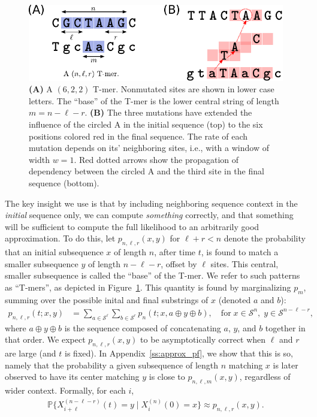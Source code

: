 \documentclass{article}
\renewcommand{\P}{\mathbb{P}}
\newcommand{\calS}{\mathcal{S}}  %
\newcommand{\nA}{\mbox{A}}  %
\newcommand{\join}{\oplus}  %
\theoremstyle{plain}
\theoremstyle{definition}
\begin{document}
\begin{figure}
    \begin{center}
        \includegraphics{Tmer-dependency}
    \end{center}
    \caption{
        \textbf{(A)} A $(6,2,2)$ T-mer.
        Nonmutated sites are shown in lower case letters.
        The ``base'' of the T-mer is the lower central
        string of length $m = n - \ell - r$.
        \textbf{(B)}
        The three mutations have extended the influence of the circled \nA{}
        in the initial sequence (top)
        to the six positions colored red in the final sequence.
        The rate of each mutation depends on its' neighboring sites,
        i.e., with a window of width $w=1$.
        Red dotted arrows show the propagation of dependency
        between the circled \nA{}
        and the third site in the final sequence (bottom).
        \label{fig:Tmers}
    }
\end{figure}



The key insight we use is that by including neighboring sequence context in the \emph{initial} sequence only,
we can compute \emph{something} correctly,
and that something will be sufficient to compute the full likelihood
to an arbitrarily good approximation.
To do this, let $p_{n,\ell,r}(x,y)$ for $\ell + r < n$ denote
the probability that an initial subsequence $x$ of length $n$, after time $t$,
is found to match a smaller subsequence $y$ of length $n-\ell-r$, offset by $\ell$ sites.
This central, smaller subsequence is called the ``base'' of the T-mer.
We refer to such patterns as ``T-mers'', as depicted in Figure~\ref{fig:Tmers}.
This quantity is found by marginalizing $p_m$,
summing over the possible inital and final substrings of $x$
(denoted $a$ and $b$):
\begin{align}
    p_{n,\ell,r}(t;x,y)
    &=
    \sum_{a \in \calS^\ell} \sum_{b \in \calS^r} p_n(t;x,a \join y \join b) ,
    \quad
    \text{for}\; x \in \calS^n, \; y \in \calS^{n-\ell-r} ,
\end{align}
where $a \join y \join b$ is the sequence composed of concatenating $a$, $y$, and $b$ together in that order.
We expect $p_{n,\ell,r}(x,y)$ to be asymptotically correct when $\ell$ and $r$ are large (and $t$ is fixed).
In Appendix~\ref{ss:approx_pf}, we show that this is so, namely that
the probability a given subsequence of length $n$ matching $x$
is later observed to have its center matching $y$
is close to $p_{n,\ell,m}(x,y)$, regardless of wider context.
Formally, for each $i$,
\begin{align} \label{eqn:window_approx}
    \P\{ X_{i+\ell}^{(n-\ell-r)}(t) = y \mid X_i^{(n)}(0) = x \}
    \approx
    p_{n,\ell,r}(x,y)
    .
\end{align}
\end{document}
